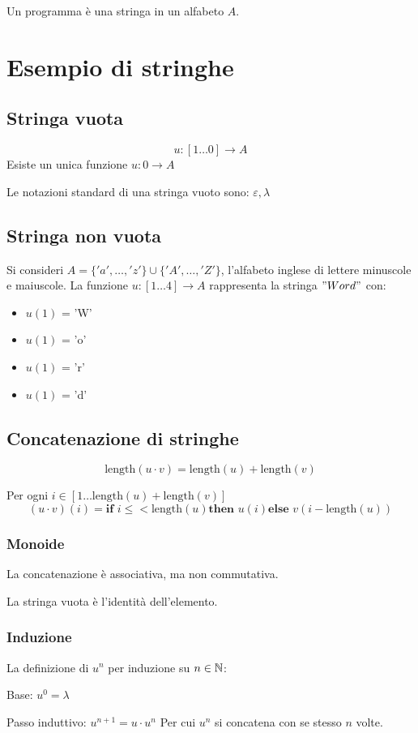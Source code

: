 \begin{theorem}
\begin{theorem}
  Un programma è una stringa in un alfabeto $A$.
\end{theorem}

\section{Esempio di stringhe}
\subsection{Stringa vuota}
\[u: [1\dots0] \rightarrow A\]
Esiste un unica funzione $u: 0\rightarrow A$

Le notazioni standard di una stringa vuoto sono: $\varepsilon, \lambda$

\subsection{Stringa non vuota}
Si consideri $A=\{'a',\dots,'z'\}\cup\{'A',\dots,'Z'\}$, l'alfabeto inglese
di lettere minuscole e maiuscole.
La funzione $u:[1\dots4]\rightarrow A$ rappresenta la stringa $"Word"$ con:
\begin{itemize}
  \item $u(1)$ = 'W'
  \item $u(1)$ = 'o'
  \item $u(1)$ = 'r'
  \item $u(1)$ = 'd'
\end{itemize}

\subsection{Concatenazione di stringhe}
\begin{theorem}
  \[\text{length}(u\cdot v) = \text{length}(u) + \text{length}(v)\]
  
  Per ogni $i\in[1\dots \text{length}(u) + \text{length}(v)]$
  \[ (u\cdot v)(i) = \textbf{if } i\leq<\text{length}(u) \textbf{then } u(i)
  \textbf{else } v(i-\text{length}(u))\]
\end{theorem}
\subsubsection{Monoide}
La concatenazione è associativa, ma non commutativa.

La stringa vuota è l'identità dell'elemento.
\subsubsection{Induzione}
La definizione di $u^n$ per induzione su $n \in \mathbb{N}$:

Base: $u^0 = \lambda$

Passo induttivo: $u^{n+1} = u \cdot u^n$
Per cui $u^n$ si concatena con se stesso $n$ volte.
\end{theorem}
